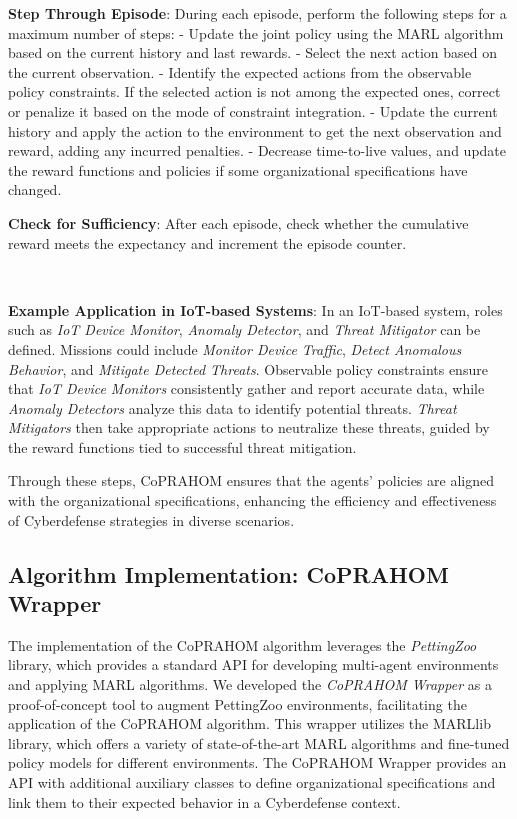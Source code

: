 \documentclass[conference]{IEEEtran}
\begin{document}
\textbf{Step Through Episode}:
During each episode, perform the following steps for a maximum number of steps:
  - Update the joint policy using the MARL algorithm based on the current history and last rewards.
  - Select the next action based on the current observation.
  - Identify the expected actions from the observable policy constraints. If the selected action is not among the expected ones, correct or penalize it based on the mode of constraint integration.
  - Update the current history and apply the action to the environment to get the next observation and reward, adding any incurred penalties.
  - Decrease time-to-live values, and update the reward functions and policies if some organizational specifications have changed.

\textbf{Check for Sufficiency}:
After each episode, check whether the cumulative reward meets the expectancy and increment the episode counter.

\

\noindent \textbf{Example Application in IoT-based Systems}: In an IoT-based system, roles such as \textit{IoT Device Monitor}, \textit{Anomaly Detector}, and \textit{Threat Mitigator} can be defined. Missions could include \textit{Monitor Device Traffic}, \textit{Detect Anomalous Behavior}, and \textit{Mitigate Detected Threats}. Observable policy constraints ensure that \textit{IoT Device Monitors} consistently gather and report accurate data, while \textit{Anomaly Detectors} analyze this data to identify potential threats. \textit{Threat Mitigators} then take appropriate actions to neutralize these threats, guided by the reward functions tied to successful threat mitigation.

Through these steps, CoPRAHOM ensures that the agents' policies are aligned with the organizational specifications, enhancing the efficiency and effectiveness of Cyberdefense strategies in diverse scenarios.


\subsection{Algorithm Implementation: CoPRAHOM Wrapper}

The implementation of the CoPRAHOM algorithm leverages the \emph{PettingZoo} library, which provides a standard API for developing multi-agent environments and applying MARL algorithms. We developed the \textit{CoPRAHOM Wrapper} as a proof-of-concept tool to augment PettingZoo environments, facilitating the application of the CoPRAHOM algorithm. This wrapper utilizes the MARLlib~\cite{hu2022marllib} library, which offers a variety of state-of-the-art MARL algorithms and fine-tuned policy models for different environments. The CoPRAHOM Wrapper provides an API with additional auxiliary classes to define organizational specifications and link them to their expected behavior in a Cyberdefense context.
\end{document}
